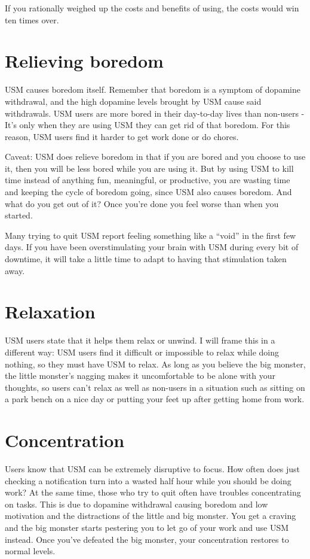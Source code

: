 \documentclass[
  openany]{book}
\begin{document}
If you rationally weighed up the costs and benefits of using, the costs would win ten times over.

\section{Relieving boredom}\label{relieving-boredom}

USM causes boredom itself. Remember that boredom is a symptom of dopamine withdrawal, and the high dopamine levels brought by USM cause said withdrawals. USM users are more bored in their day-to-day lives than non-users - It's only when they are using USM they can get rid of that boredom. For this reason, USM users find it harder to get work done or do chores.

Caveat: USM does relieve boredom in that if you are bored and you choose to use it, then you will be less bored while you are using it. But by using USM to kill time instead of anything fun, meaningful, or productive, you are wasting time and keeping the cycle of boredom going, since USM also causes boredom. And what do you get out of it? Once you're done you feel worse than when you started.

Many trying to quit USM report feeling something like a ``void'' in the first few days. If you have been overstimulating your brain with USM during every bit of downtime, it will take a little time to adapt to having that stimulation taken away.

\section{Relaxation}\label{relaxation}

USM users state that it helps them relax or unwind. I will frame this in a different way: USM users find it difficult or impossible to relax while doing nothing, so they must have USM to relax. As long as you believe the big monster, the little monster's nagging makes it uncomfortable to be alone with your thoughts, so users can't relax as well as non-users in a situation such as sitting on a park bench on a nice day or putting your feet up after getting home from work.

\section{Concentration}\label{concentration}

Users know that USM can be extremely disruptive to focus. How often does just checking a notification turn into a wasted half hour while you should be doing work? At the same time, those who try to quit often have troubles concentrating on tasks. This is due to dopamine withdrawal causing boredom and low motivation and the distractions of the little and big monster. You get a craving and the big monster starts pestering you to let go of your work and use USM instead. Once you've defeated the big monster, your concentration restores to normal levels.
\end{document}
